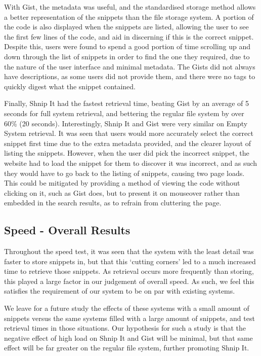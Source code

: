 With Gist, the metadata was useful, and the standardised storage method allows a better representation of the snippets than the file storage system. 
A portion of the code is also displayed when the snippets are listed, allowing the user to see the first few lines of the code, and aid in discerning if this is the correct snippet.
Despite this, users were found to spend a good portion of time scrolling up and down through the list of snippets in order to find the one they required, due to the nature of the user interface and minimal metadata. 
The Gists did not always have descriptions, as some users did not provide them, and there were no tags to quickly digest what the snippet contained.

Finally, Shnip It had the fastest retrieval time, beating Gist by an average of 5 seconds for full system retrieval, and bettering the regular file system by over 60\% (20 seconds). 
Interestingly, Shnip It and Gist were very similar on Empty System retrieval.
It was seen that users would more accurately select the correct snippet first time due to the extra metadata provided, and the clearer layout of listing the snippets.
However, when the user did pick the incorrect snippet, the website had to load the snippet for them to discover it was incorrect, and as such they would have to go back to the listing of snippets, causing two page loads.
This could be mitigated by providing a method of viewing the code without clicking on it, such as Gist does, but to present it on mouseover rather than embedded in the search results, as to refrain from cluttering the page.

\subsection{Speed - Overall Results}
Throughout the speed test, it was seen that the system with the least detail was faster to store snippets in, but that this `cutting corners' led to a much increased time to retrieve those snippets. 
As retrieval occurs more frequently than storing, this played a large factor in our judgement of overall speed.
As such, we feel this satisfies the requirement of our system to be on par with existing systems.

We leave for a future study the effects of these systems with a small amount of snippets versus the same systems filled with a large amount of snippets, and test retrieval times in those situations.
Our hypothesis for such a study is that the negative effect of high load on Shnip It and Gist will be minimal, but that same effect will be far greater on the regular file system, further promoting Shnip It.

